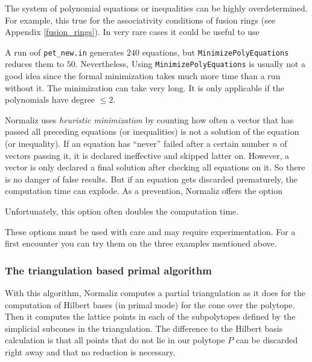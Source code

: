 The system of polynomial equations or inequalities  can be highly overdetermined. For example, this true for the associativity conditions of fusion rings (see Appendix \ref{fusion_rings}). In very rare cases it could be useful to use
\begin{itemize}
	\itemtt[MinimizePolyEquations]
\end{itemize} 
A run oof \verb*|pet_new.in| generates $240$ equations, but \verb*|MinimizePolyEquations| reduces them to $50$. Nevertheless, Using \verb*|MinimizePolyEquations| is usually not a good idea since the formal minimization takes much more time than a run without it. The minimization can take very long. It is only applicable if the polynomials have degree $\le 2$.

 Normaliz uses \emph{heuristic minimization} by counting how often a vector that has passed all preceding equations (or inequalities) is not a solution of the equation (or inequality). If an equation has ``never'' failed after a certain number $n$ of vectors passing it, it is declared ineffective and skipped latter on. However, a vector is only declared a final solution after checking all equations on it. So there is no danger of false results. But if an equation gets discarded prematurely, the computation time can explode. As a prevention, Normaliz offers the option
\begin{itemize}
\end{itemize}
Unfortunately, this option often doubles the computation time.

These options must be used with care and may require experimentation. For a first encounter you can try them on the three examples mentioned above. 

\subsubsection{The triangulation based primal algorithm}

With this algorithm, Normaliz computes a partial triangulation as it does for the computation of Hilbert bases (in primal mode) for the cone over the polytope. Then it computes the lattice points in each of the subpolytopes defined by the simplicial subcones in the triangulation. The difference to the Hilbert basis calculation is that all points that do not lie in our polytope $P$ can be discarded right away and that no reduction is necessary.

